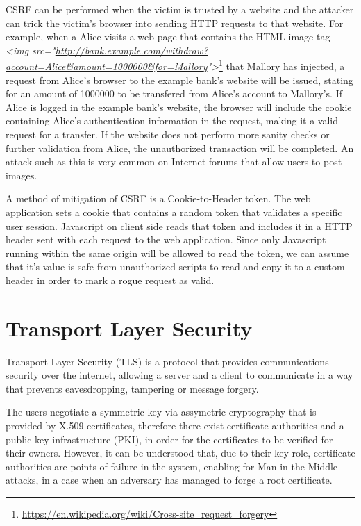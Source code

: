 CSRF can be performed when the victim is trusted by a website and the attacker
can trick the victim's browser into sending HTTP requests to that website. For
example, when a Alice visits a web page that contains the HTML image tag
\textit{<img
src="\url{http://bank.example.com/withdraw?account=Alice&amount=1000000&for=Mallory}">}\footnote{\url{https://en.wikipedia.org/wiki/Cross-site_request_forgery}}
that Mallory has injected, a request from Alice's browser to the example bank's
website will be issued, stating for an amount of 1000000 to be transfered from
Alice's account to Mallory's. If Alice is logged in the example bank's website,
the browser will include the cookie containing Alice's authentication
information in the request, making it a valid request for a transfer. If the
website does not perform more sanity checks or further validation from Alice,
the unauthorized transaction will be completed. An attack such as this is very
common on Internet forums that allow users to post images.

A method of mitigation of CSRF is a Cookie-to-Header token. The web application
sets a cookie that contains a random token that validates a specific user
session. Javascript on client side reads that token and includes it in a HTTP
header sent with each request to the web application. Since only Javascript
running within the same origin will be allowed to read the token, we can assume
that it's value is safe from unauthorized scripts to read and copy it to a
custom header in order to mark a rogue request as valid.

\section{Transport Layer Security}\label{sec:tls}

Transport Layer Security (TLS) is a protocol that provides communications
security over the internet, allowing a server and a client to communicate in a
way that prevents eavesdropping, tampering or message forgery. \cite{tls12}

The users negotiate a symmetric key via assymetric cryptography that is provided
by X.509 certificates, therefore there exist certificate authorities and a
public key infrastructure (PKI), in order for the certificates to be verified
for their owners. However, it can be understood that, due to their key role,
    certificate authorities are points of failure in the system, enabling for
    Man-in-the-Middle attacks, in a case when an adversary has managed to forge
    a root certificate.

